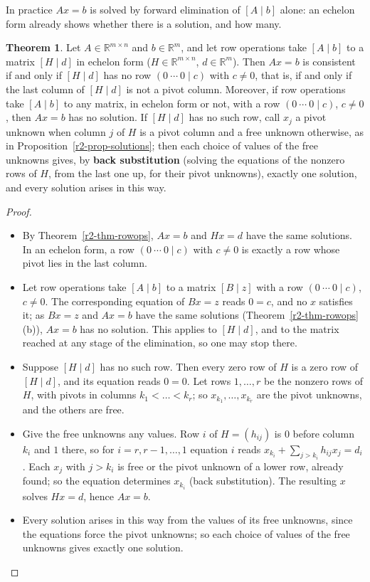 \documentclass[12pt]{article}
\newcommand{\R}{\mathbb R}
\theoremstyle{definition}
\newtheorem{theorem}{Theorem}
\begin{document}
In practice \(Ax=b\) is solved by forward elimination of \([A\mid b]\) alone: an echelon form
already shows whether there is a solution, and how many.

\begin{theorem}\label{thm:r2-consistency}
Let \(A\in\R^{m\times n}\) and \(b\in\R^m\), and let row operations take \([A\mid b]\) to a
matrix \([H\mid d]\) in echelon form (\(H\in\R^{m\times n}\), \(d\in\R^m\)). Then \(Ax=b\) is
consistent if and only if \([H\mid d]\) has no row \((0\ \cdots\ 0\mid c)\) with \(c\ne0\),
that is, if and only if the last column of \([H\mid d]\) is not a pivot column. Moreover, if row operations take
\([A\mid b]\) to any matrix, in echelon form or not, with a row \((0\ \cdots\ 0\mid c)\), \(c\ne0\), then \(Ax=b\)
has no solution. If \([H\mid d]\) has no such row, call \(x_j\) a pivot unknown when column \(j\) of \(H\) is a
pivot column and a free unknown otherwise, as in Proposition~\ref{r2-prop-solutions}; then each choice of values of
the free unknowns gives, by \textbf{back substitution} (solving the equations of the nonzero rows of \(H\), from the
last one up, for their pivot unknowns), exactly one solution, and every solution arises in this way.
\end{theorem}
\begin{proof}
\begin{itemize}
\item By Theorem~\ref{r2-thm-rowops}, \(Ax=b\) and \(Hx=d\) have the same solutions. In an
echelon form, a row \((0\ \cdots\ 0\mid c)\) with \(c\ne0\) is exactly a row whose pivot lies
in the last column.
\item Let row operations take \([A\mid b]\) to a matrix \([B\mid z]\) with a row \((0\ \cdots\ 0\mid c)\),
\(c\ne0\). The corresponding equation of \(Bx=z\) reads \(0=c\), and no \(x\) satisfies it; as \(Bx=z\) and
\(Ax=b\) have the same solutions (Theorem~\ref{r2-thm-rowops}(b)), \(Ax=b\) has no solution. This applies to
\([H\mid d]\), and to the matrix reached at any stage of the elimination, so one may stop there.
\item Suppose \([H\mid d]\) has no such row. Then every zero row of \(H\) is a zero row of \([H\mid d]\),
and its equation reads \(0=0\). Let rows \(1,\dots,r\) be the nonzero rows of \(H\), with pivots
in columns \(k_1<\dots<k_r\); so \(x_{k_1},\dots,x_{k_r}\) are the pivot unknowns, and the others are free.
\item Give the free unknowns any values. Row \(i\) of \(H=(h_{ij})\) is \(0\) before column
\(k_i\) and \(1\) there, so for \(i=r,r-1,\dots,1\) equation \(i\) reads
\(x_{k_i}+\sum_{j>k_i}h_{ij}x_j=d_i\). Each \(x_j\) with \(j>k_i\) is free or the pivot unknown
of a lower row, already found; so the equation determines \(x_{k_i}\) (back substitution). The resulting \(x\)
solves \(Hx=d\), hence \(Ax=b\).
\item Every solution arises in this way from the values of its free unknowns, since the
equations force the pivot unknowns; so each choice of values of the free unknowns gives exactly one
solution.\qedhere
\end{itemize}
\end{proof}
\end{document}
